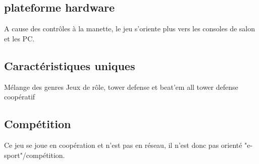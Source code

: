 \documentclass[12pt]{article}
\begin{document}
\subsection{plateforme hardware}
A cause des contrôles à la manette, le jeu s'oriente plus vers les consoles de salon et les PC.
\subsection{Caractéristiques uniques}
Mélange des genres Jeux de rôle, tower defense et beat'em all
tower defense coopératif
\subsection{Compétition}
Ce jeu se joue en coopération et n'est pas en réseau, il n'est donc pas orienté "e-sport"/compétition.


	
\end{document}
